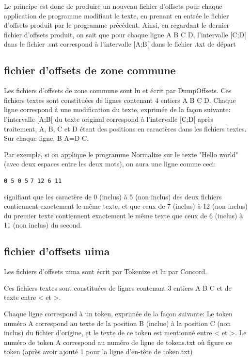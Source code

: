 Le principe est donc de produire un nouveau fichier d'offsets pour chaque application de programme modifiant le texte, en prenant en entrée le fichier d'offsets produit par le programme précédent. Ainsi, en regardant le dernier fichier d'offsets produit, on sait que pour chaque ligne A B C D, l'intervalle [C;D[ dans le fichier .snt correspond à l'intervalle [A;B[ dans le fichier .txt de départ


\subsection{fichier d'offsets de zone commune}
\label{subsection-offsets-common}

Les fichiers d'offsets de zone commune sont lu et écrit par DumpOffsets.
\bigskip
Ces fichiers textes sont constituées de lignes contenant 4 entiers A B C D. Chaque ligne correspond à une modification du texte, exprimée de la façon suivante:
\bigskip
l'intervalle [A;B[ du texte original correspond à l'intervalle [C;D[ après traitement, A, B, C et D étant des positions en caractères dans les fichiers textes. Sur chaque ligne, B-A=D-C.
\bigskip

Par exemple, si on applique le programme Normalize sur le texte "Hello world" (avec deux espaces entre les deux mots), on aura une ligne comme ceci:

\bigskip
\noindent \verb+0 5 0 5+
\newline
\noindent \verb+7 12 6 11+
\bigskip

signifiant que les caractère de 0 (inclus) à 5 (non inclus) des deux fichiers contiennent exactement le même texte, et que ceux de 7 (inclus) à 12 (non inclus) du premier texte
contiennent exactement le même texte que ceux de 6 (inclus) à 11 (non inclus) du second.



\subsection{fichier d'offsets uima}
\label{subsection-offsets-uima}
Les fichiers d'offsets uima sont écrit par Tokenize et lu par Concord.

\bigskip
Ces fichiers textes sont constituées de lignes contenant 3 entiers A B C et de texte entre < et >.

\bigskip
Chaque ligne correspond à un token, exprimée de la façon suivante:
Le token numéro A correspond au texte de la position B (inclue) à la position C (non inclus) du fichier d'origine, et le texte de ce token est mentionné entre < et >.
Le numéro de token A correspond au numéro de ligne de tokens.txt où figure ce token (après avoir ajouté 1 pour la ligne d'en-tête de token.txt)

\bigskip
